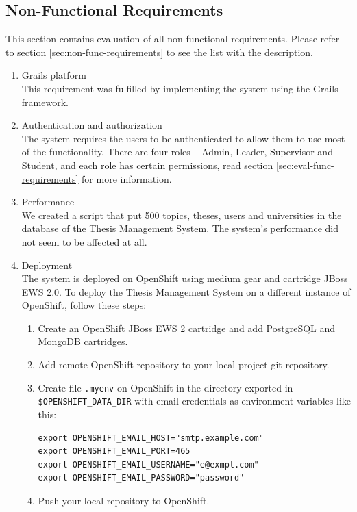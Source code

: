 \subsection{Non-Functional Requirements}

This section contains evaluation of all non-functional requirements. Please refer to section \ref{sec:non-func-requirements} to see the list with the description.

\begin{enumerate}
    \item Grails platform\\
    This requirement was fulfilled by implementing the system using the Grails framework.

    \item Authentication and authorization\\
    The system requires the users to be authenticated to allow them to use most of the functionality. There are four roles -- Admin, Leader, Supervisor and Student, and each role has certain permissions, read section \ref{sec:eval-func-requirements} for more information.

    \item Performance\\
    We created a script that put 500 topics, theses, users and universities in the database of the Thesis Management System. The system's performance did not seem to be affected at all.

    \item Deployment\\
    The system is deployed on OpenShift using medium gear and cartridge JBoss EWS 2.0. To deploy the Thesis Management System on a different instance of OpenShift, follow these steps:
    \begin{enumerate}
        \item Create an OpenShift JBoss EWS 2 cartridge and add PostgreSQL and MongoDB cartridges.
        \item Add remote OpenShift repository to your local project git repository.
        \item Create file \texttt{.myenv} on OpenShift in the directory exported in \texttt{\$OPENSHIFT\_DATA\_DIR} with email credentials as environment variables like this:
            \begin{verbatim}
export OPENSHIFT_EMAIL_HOST="smtp.example.com"
export OPENSHIFT_EMAIL_PORT=465
export OPENSHIFT_EMAIL_USERNAME="e@exmpl.com"
export OPENSHIFT_EMAIL_PASSWORD="password"
            \end{verbatim}
        \item Push your local repository to OpenShift.


\end{enumerate}
\end{enumerate}
